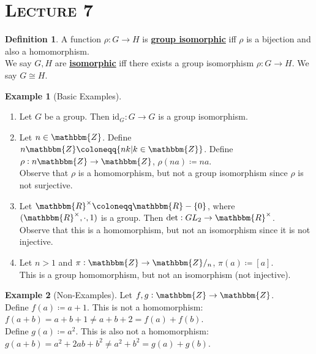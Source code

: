 \documentclass{article}
\newcommand{\Z}{\mathbbm{Z}}
\newcommand{\R}{\mathbbm{R}}
\newcommand{\coleq}{\coloneqq}
\newcommand{\id}{\mathrm{id}}
\newcommand{\define}[1]{\textbf{\underline{#1}}}
\newcommand{\func}[3]{#1: #2 \to #3}
\theoremstyle{definition}
\newtheorem*{defn}{Definition}
\newtheorem*{ex}{Example}
\theoremstyle{remark}
\newcommand{\iso}{\cong}
\begin{document}
    \section*{\textbf{\textsc{Lecture 7}}}{
        \begin{defn}
            A function $\func{\rho}{G}{H}$ is \define{group isomorphic} iff $\rho$ is a bijection and also a homomorphism.\\
            We say $G,H$ are \define{isomorphic} iff there exists a group isomorphism $\func{\rho}{G}{H}$. We say $G \iso H$.
        \end{defn}
        
        \begin{ex}[Basic Examples]\hfill
            \begin{enumerate}
                \item Let $G$ be a group. Then $\func{\id_G}{G}{G}$ is a group isomorphism.
                \item Let $n \in \Z$. Define $n\Z \coleq \{nk|k \in \Z\}$. Define $\func{\rho}{n\Z}{\Z}$, $\rho(na) \coleq na$.\\
                Observe that $\rho$ is a homomorphism, but not a group isomorphism since $\rho$ is not surjective.
                \item Let $\R^\times \coleq \R-\{0\}$, where $(\R^\times,\cdot, 1)$ is a group. Then $\func{\det}{GL_2}{\R^\times}$.\\
                Observe that this is a homomorphism, but not an isomorphism since it is not injective.
                \item Let $n>1$ and $\func{\pi}{\Z}{\Z/_n}$, $\pi(a) \coleq [a]$.\\
                This is a group homomorphism, but not an isomorphism (not injective).
            \end{enumerate}
        \end{ex}
        
        \begin{ex}[Non-Examples]
            Let $\func{f,g}{\Z}{\Z}$.\\
            Define $f(a) \coleq a+1$. This is not a homomorphism: $f(a+b)=a+b+1\neq a+b+2=f(a)+f(b)$.\\
            Define $g(a) \coleq a^2$. This is also not a homomorphism: $g(a+b)=a^2+2ab+b^2\neq a^2+b^2=g(a)+g(b)$.
        \end{ex}
        
}
\end{document}
